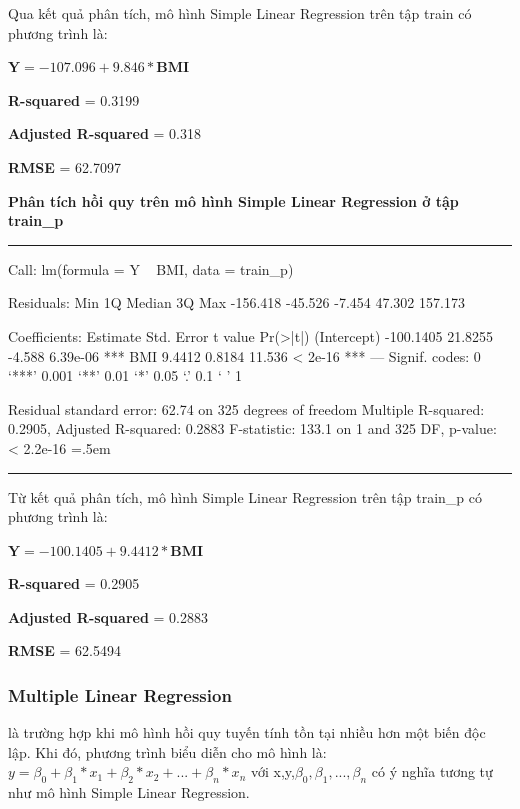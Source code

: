 \documentclass[runningheads]{llncs}
\newenvironment{lcverbatim}
 {\SaveVerbatim{cverb}}
 {\endSaveVerbatim
  \flushleft\fboxrule=0pt\fboxsep=.5em
  \colorbox{cverbbg}{%
    \makebox[\dimexpr\linewidth-2\fboxsep][l]{\BUseVerbatim{cverb}}%
  }
  \endflushleft
}
\begin{document}
Qua kết quả phân tích, mô hình Simple Linear Regression trên tập train có phương trình là:
\begin{center}
	$\textbf{Y}=  -107.096 + 9.846*\textbf{BMI}$
\end{center}

\textbf{R-squared} = 0.3199

\textbf{Adjusted R-squared} = 0.318

\textbf{RMSE} = 62.7097

\vspace{0.5cm}
\textbf{Phân tích hồi quy trên mô hình Simple Linear Regression ở tập train\_p}
\vspace{0.5cm}
\hrule
\begin{lcverbatim}
Call:
lm(formula = Y ~ BMI, data = train_p)

Residuals:
     Min       1Q   Median       3Q      Max 
-156.418  -45.526   -7.454   47.302  157.173 

Coefficients:
             Estimate Std. Error t value Pr(>|t|)    
(Intercept) -100.1405    21.8255  -4.588 6.39e-06 ***
BMI            9.4412     0.8184  11.536  < 2e-16 ***
---
Signif. codes:  0 ‘***’ 0.001 ‘**’ 0.01 ‘*’ 0.05 ‘.’ 0.1 ‘ ’ 1

Residual standard error: 62.74 on 325 degrees of freedom
Multiple R-squared:  0.2905,	Adjusted R-squared:  0.2883 
F-statistic: 133.1 on 1 and 325 DF,  p-value: < 2.2e-16
\end{lcverbatim}
\hrule
\vspace{0.5cm}

Từ kết quả phân tích, mô hình Simple Linear Regression trên tập train\_p có phương trình là:
\begin{center}
	$\textbf{Y}=  -100.1405 + 9.4412*\textbf{BMI}$
\end{center}

\textbf{R-squared} = 0.2905 

\textbf{Adjusted R-squared} = 0.2883

\textbf{RMSE} = 62.5494

\subsubsection{Multiple Linear Regression} là trường hợp khi mô hình hồi quy tuyến tính tồn tại nhiều hơn một biến độc lập. Khi đó, phương trình biểu diễn cho mô hình là: $y= \beta_0 +\beta_1*x_1+\beta_2*x_2+...+\beta_n*x_n$ với x,y,$\beta_0, \beta_1,...,\beta_n$ có ý nghĩa tương tự như mô hình Simple Linear Regression.
\end{document}
